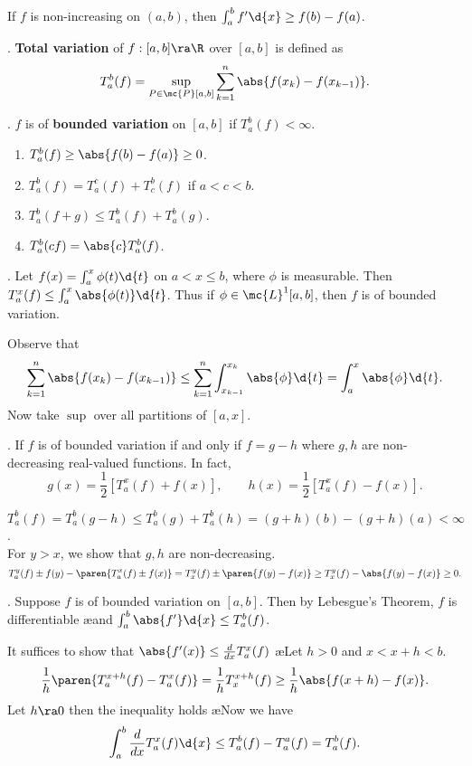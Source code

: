 \rmk If \(f\) is non-increasing on \((a, b)\), then \(\int_a^b f'\d{x} \geq f(b) - f(a)\).

.  \textbf{Total variation} of \(f: [a, b] \ra \R\) over \([a, b]\) is defined as
\[
    T_a^b(f) = \sup_{P \in \mc{P}[a, b]} \sum_{k=1}^{n} \abs{f(x_k) - f(x_{k-1})}.
\]

.  \(f\) is of \textbf{bounded variation} on \([a, b]\) if \(T_a^b(f) < \infty\).

\rmk
\begin{enumerate}
    \item \(T_a^b(f) \geq \abs{f(b) - f(a)} \geq 0\).
    \item \(T_a^b(f) = T_a^c(f) + T_c^b(f)\) if \(a < c < b\).
    \item \(T_a^b(f + g) \leq T_a^b(f) + T_a^b(g)\).
    \item \(T_a^b(cf) = \abs{c}T_a^b(f)\).
\end{enumerate}

\prop. Let \(f(x) = \int_a^x \phi(t)\d{t}\) on \(a < x \leq b\), where \(\phi\) is measurable. Then \(T_a^x(f) \leq \int_a^x \abs{\phi(t)} \d{t}\). Thus if \(\phi \in \mc{L}^{1}[a, b]\), then \(f\) is of bounded variation.

\pf Observe that
\[
    \sum_{k=1}^{n} \abs{f(x_k) - f(x_{k-1})} \leq \sum_{k=1}^{n} \int_{x_{k-1}}^{x_k} \abs{\phi} \d{t} = \int_a^x \abs{\phi} \d{t}.
\]
Now take \(\sup\) over all partitions of \([a, x]\).

\thm. If \(f\) is of bounded variation if and only if \(f = g - h\) where \(g, h\) are non-decreasing real-valued functions. In fact,
\[
    g(x) = \frac{1}{2}\left[T_a^x(f) + f(x)\right], \qquad h(x) = \frac{1}{2}\left[T_a^x(f) - f(x)\right].
\]

\pf \note{\mimpd} \(T_a^b(f) = T_a^b(g-h) \leq T_a^b(g) + T_a^b(h) = (g+h)(b) - (g+h)(a) < \infty\).\\
\note{\mimp} For \(y > x\), we show that \(g, h\) are non-decreasing.
\[
    T_a^y(f) \pm f(y) - \paren{T_a^x(f) \pm f(x)} = T_x^y(f) \pm \paren{f(y) - f(x)} \geq T_x^y(f) - \abs{f(y) - f(x)} \geq 0.
\]

\prop. Suppose \(f\) is of bounded variation on \([a, b]\). Then by Lebesgue's Theorem, \(f\) is differentiable \ae and \(\int_a^b \abs{f'} \d{x} \leq T_a^b(f)\).

\pf It suffices to show that \(\abs{f'(x)} \leq \frac{d}{dx} T_a^x(f)\) \ae Let \(h > 0\) and \(x < x + h < b\).
\[
    \frac{1}{h}\paren{T_a^{x+h} (f) - T_a^x(f)} = \frac{1}{h}T_x^{x+h}(f) \geq \frac{1}{h} \abs{f(x+h) - f(x)}.
\]
Let \(h \ra 0\) then the inequality holds \ae Now we have
\[
    \int_a^b \frac{d}{dx}T_a^x(f)\d{x} \leq T_a^b(f) - T_a^a(f) = T_a^b(f).
\]

